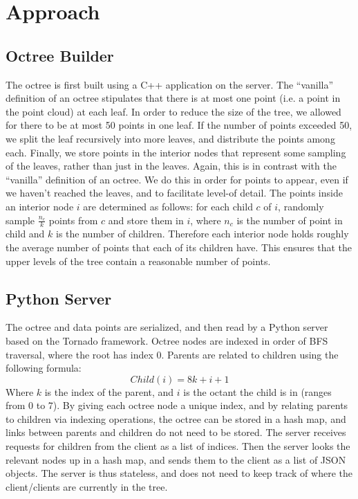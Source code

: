 \documentclass[11pt, twocolumn]{article}
\begin{document}
\section{Approach}
\subsection{Octree Builder}
The octree is first built using a C++ application on the server. The ``vanilla'' definition of an octree stipulates that there is at most one point (i.e. a point in the point cloud) at each leaf. In order to reduce the size
of the tree, we allowed for there to be at most 50 points in one leaf. If the number of points exceeded 50, we split the leaf recursively into more leaves, and distribute the points among each. Finally, we store points in the interior nodes that represent some sampling of the leaves, rather than just in the leaves. Again, this is in contrast with the ``vanilla'' definition of an octree. We do this in order for points to appear, even if we haven't reached the leaves, and to facilitate level-of detail. The points inside an interior node $i$ are determined as follows: for each child $c$ of $i$, randomly sample $\frac{n_{c}}{k}$ points from $c$ and store them in $i$, where $n_{c}$ is the number of point in child and $k$ is the number of children. Therefore each interior node holds roughly the average number of points that each of its children have. This ensures that the upper levels of the tree contain a reasonable number of points.
\subsection{Python Server}
The octree and data points are serialized, and then read by a Python server based on the Tornado framework. Octree nodes are indexed in order of BFS traversal, where the root has index 0. Parents are related to children using the following formula: 
\begin{equation}
Child(i) = 8k + i + 1
\end{equation}
Where $k$ is the index of the parent, and $i$ is the octant the child is in (ranges from 0 to 7). By giving each octree node a unique index, and by relating parents to children via indexing operations, the octree can be stored in a hash map, and links between parents and children do not need to be stored. The server receives requests for children from the client as a list of indices. Then the server looks the relevant nodes up
in a hash map, and sends them to the client as a list of JSON objects. The server is thus stateless, and does not need to keep track of where the client/clients are currently in the tree.
\end{document}
